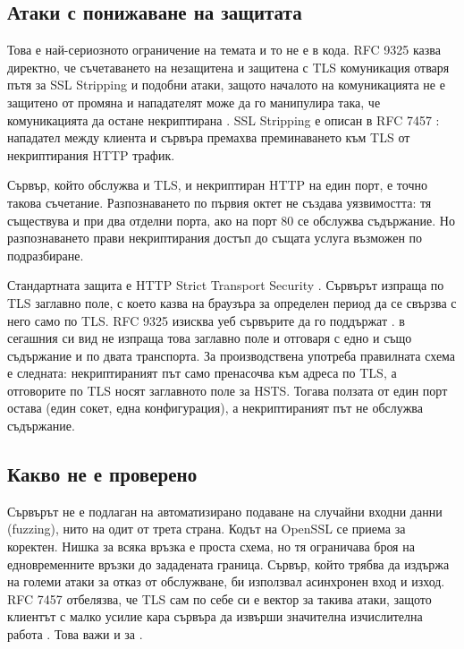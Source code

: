 \subsection{Атаки с понижаване на защитата}
\label{sec:downgrade}

Това е най-сериозното ограничение на темата и то не е в кода. RFC 9325 казва директно,
че съчетаването на незащитена и защитена с TLS комуникация отваря пътя за SSL Stripping и
подобни атаки, защото началото на комуникацията не е защитено от промяна и нападателят
може да го манипулира така, че комуникацията да остане некриптирана
\cite[раздел 3.2]{rfc9325}. SSL Stripping е описан в RFC 7457 \cite[раздел 2.1]{rfc7457}:
нападател между клиента и сървъра премахва преминаването към TLS от некриптирания HTTP
трафик.

Сървър, който обслужва и TLS, и некриптиран HTTP на един порт, е точно такова
съчетание. Разпознаването по първия октет не създава уязвимостта: тя съществува и при
два отделни порта, ако на порт 80 се обслужва съдържание. Но разпознаването прави
некриптирания достъп до същата услуга възможен по подразбиране.

Стандартната защита е HTTP Strict Transport Security \cite{rfc6797}. Сървърът изпраща
по TLS заглавно поле, с което казва на браузъра за определен период да се свързва с него
само по TLS. RFC 9325 изисква уеб сървърите да го поддържат \cite[раздел 3.2]{rfc9325}.
 в сегашния си вид не изпраща това заглавно поле и отговаря с едно и също
съдържание и по двата транспорта. За производствена употреба правилната схема е
следната: некриптираният път само пренасочва към адреса по TLS, а отговорите по TLS
носят заглавното поле за HSTS. Тогава ползата от един порт остава (един сокет, една
конфигурация), а некриптираният път не обслужва съдържание.

\subsection{Какво не е проверено}

Сървърът не е подлаган на автоматизирано подаване на случайни входни данни (fuzzing),
нито на одит от трета страна. Кодът на OpenSSL се приема за коректен. Нишка за всяка
връзка е проста схема, но тя ограничава броя на едновременните връзки до зададената
граница. Сървър, който трябва да издържа на големи атаки за отказ от обслужване, би
използвал асинхронен вход и изход. RFC 7457 отбелязва, че TLS сам по себе си е вектор за
такива атаки, защото клиентът с малко усилие кара сървъра да извърши значителна
изчислителна работа \cite[раздел 2.13]{rfc7457}. Това важи и за .
